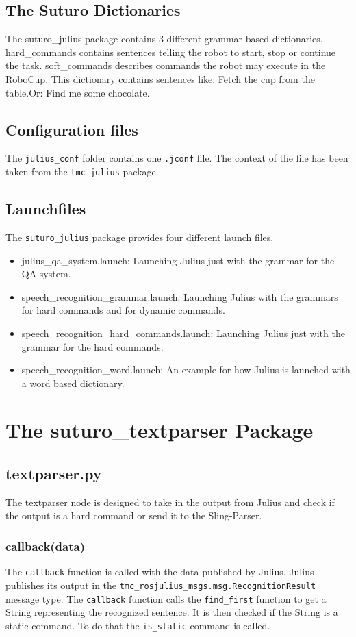 \documentclass[main.tex]{subfiles}
\begin{document}
		\subsection{The Suturo Dictionaries}
		The suturo\_julius package contains 3 different grammar-based dictionaries. hard\_commands contains sentences telling the robot to start, stop or continue the task.
		soft\_commands describes commands the robot may execute in the RoboCup. This dictionary contains sentences like: Fetch the cup from the table.Or: Find me some chocolate.
		\subsection{Configuration files}
		The \texttt{julius\_conf} folder contains one \texttt{.jconf} file. The context of the file has been taken from the \texttt{tmc\_julius} package.
		\subsection{Launchfiles}
		The \texttt{suturo\_julius} package provides four different launch files.\\
		\begin{itemize}
			\item julius\_qa\_system.launch:
			\subitem Launching Julius just with the grammar for the QA-system.
			\item speech\_recognition\_grammar.launch:
			\subitem Launching Julius with the grammars for hard commands and for dynamic commands.
			\item speech\_recognition\_hard\_commands.launch:
			\subitem Launching Julius just with the grammar for the hard commands.
			\item speech\_recognition\_word.launch:
			\subitem An example for how Julius is launched with a word based dictionary.
		\end{itemize}
	\section{The suturo\_textparser Package}
		\subsection{textparser.py}
		The textparser node is designed to take in the output from Julius and check if the output is a hard command or send it to the Sling-Parser.
		\subsubsection{callback(data)}
		The \texttt{callback} function is called with the data published by Julius. Julius publishes its output in the \texttt{tmc\_rosjulius\_msgs.msg.RecognitionResult} message type. The \texttt{callback} function calls the \texttt{find\_first} function to get a String representing the recognized sentence. It is then checked if the String is a static command. To do that the \texttt{is\_static} command is called.
		
\end{document}
